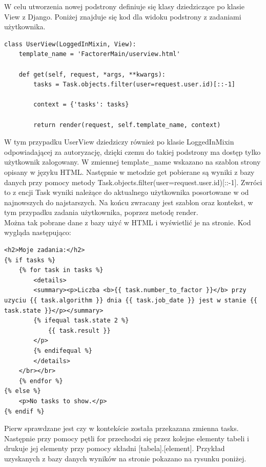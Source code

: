 \documentclass{article}
\begin{document}
W celu utworzenia nowej podstrony definiuje się klasy dziedziczące po klasie View z Django. Poniżej znajduje się kod dla widoku podstrony z zadaniami użytkownika.

\begin{lstlisting}
class UserView(LoggedInMixin, View):
    template_name = 'FactorerMain/userview.html'

    def get(self, request, *args, **kwargs):
        tasks = Task.objects.filter(user=request.user.id)[::-1]

        context = {'tasks': tasks}

        return render(request, self.template_name, context)
\end{lstlisting}

W tym przypadku UserView dziedziczy również po klasie LoggedInMixin odpowiadającej za autoryzację, dzięki czemu do takiej podstrony ma dostęp tylko użytkownik zalogowany. W zmiennej template\_name wskazano na szablon strony opisany w języku HTML. Następnie w metodzie get pobierane są wyniki z bazy danych przy pomocy metody Task.objects.filter(user=request.user.id)[::-1]. Zwróci to z encji Task wyniki należące do aktualnego użytkownika posortowane w od najnowszych do najstarszych. Na końcu zwracany jest szablon oraz kontekst, w tym przypadku zadania użytkownika, poprzez metodę render.\\

Można tak pobrane dane z bazy użyć w HTML i wyświetlić je na stronie. Kod wygląda następująco:

\begin{lstlisting}
<h2>Moje zadania:</h2>
{% if tasks %}
    {% for task in tasks %}
        <details>
        <summary><p>Liczba <b>{{ task.number_to_factor }}</b> przy uzyciu {{ task.algorithm }} dnia {{ task.job_date }} jest w stanie {{ task.state }}</p></summary>
        {% ifequal task.state 2 %}         
            {{ task.result }}
        </p>
        {% endifequal %}
        </details>
    </br></br>  
    {% endfor %}  
{% else %}
    <p>No tasks to show.</p>
{% endif %}
\end{lstlisting}

Pierw sprawdzane jest czy w kontekście została przekazana zmienna tasks. Następnie przy pomocy pętli for przechodzi się przez kolejne elementy tabeli i drukuje jej elementy przy pomocy składni [tabela].[element]. Przykład uzyskanych z bazy danych wyników na stronie pokazano na rysunku poniżej.
\end{document}

